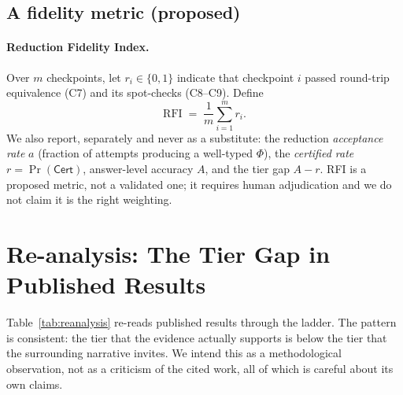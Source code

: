 \documentclass[11pt,a4paper]{article}
\theoremstyle{plain}
\theoremstyle{remark}
\newcommand{\cert}{\mathsf{Cert}}       %
\begin{document}
\subsection{A fidelity metric (proposed)}

\paragraph{Reduction Fidelity Index.}
Over $m$ checkpoints, let $r_i\in\{0,1\}$ indicate that checkpoint $i$ passed
round-trip equivalence (C7) and its spot-checks (C8--C9).  Define
\[
  \mathrm{RFI} \;=\; \frac{1}{m}\sum_{i=1}^{m} r_i .
\]
We also report, separately and never as a substitute: the reduction
\emph{acceptance rate} $a$ (fraction of attempts producing a well-typed
$\Phi$), the \emph{certified rate} $r=\Pr(\cert)$, answer-level accuracy $A$,
and the tier gap $A-r$.  RFI is a proposed metric, not a validated one; it
requires human adjudication and we do not claim it is the right weighting.

\section{Re-analysis: The Tier Gap in Published Results}
\label{sec:reanalysis}

Table~\ref{tab:reanalysis} re-reads published results through the ladder.  The
pattern is consistent: the tier that the evidence actually supports is below
the tier that the surrounding narrative invites.  We intend this as a
methodological observation, not as a criticism of the cited work, all of which
is careful about its own claims.
\end{document}
